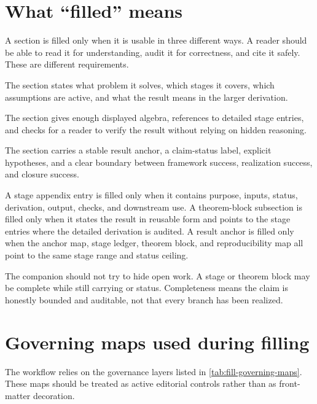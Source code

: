\section{What ``filled'' means}
\label{sec:fill-definition}

A section is filled only when it is usable in three different ways.  A reader should be able to read it for understanding, audit it for correctness, and cite it safely.  These are different requirements.

\begin{description}[leftmargin=2.9em]
\item[Readable.] The section states what problem it solves, which stages it covers, which assumptions are active, and what the result means in the larger derivation.
\item[Auditable.] The section gives enough displayed algebra, references to detailed stage entries, and checks for a reader to verify the result without relying on hidden reasoning.
\item[Citable.] The section carries a stable result anchor, a claim-status label, explicit hypotheses, and a clear boundary between framework success, realization success, and closure success.
\end{description}

A stage appendix entry is filled only when it contains purpose, inputs, status, derivation, output, checks, and downstream use.  A theorem-block subsection is filled only when it states the result in reusable form and points to the stage entries where the detailed derivation is audited.  A result anchor is filled only when the anchor map, stage ledger, theorem block, and reproducibility map all point to the same stage range and status ceiling.

The companion should not try to hide open work.  A stage or theorem block may be complete while still carrying \StatusOpen{} or \StatusNumerical{} status.  Completeness means the claim is honestly bounded and auditable, not that every branch has been realized.

\section{Governing maps used during filling}
\label{sec:fill-governing-maps}

The workflow relies on the governance layers listed in \cref{tab:fill-governing-maps}.  These maps should be treated as active editorial controls rather than as front-matter decoration.

